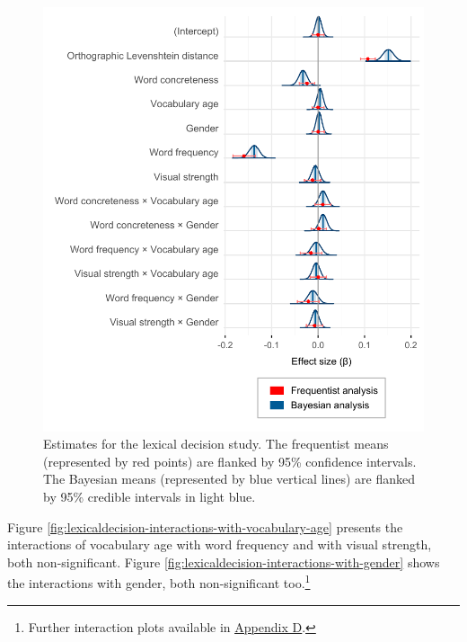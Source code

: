\documentclass[
  12pt,
  man,floatsintext]{apa7}
\begin{document}
\begin{figure}

{\centering \includegraphics[width=1\linewidth]{../lexicaldecision/frequentist_bayesian_plots/plots/lexicaldecision_frequentist_bayesian_plot_weaklyinformativepriors_exgaussian} 

}

\caption{Estimates for the lexical decision study. The frequentist means (represented by red points) are flanked by 95\% confidence intervals. The Bayesian means (represented by blue vertical lines) are flanked by 95\% credible intervals in light blue.}\label{fig:lexicaldecision-frequentist-bayesian-plot-weaklyinformativepriors-exgaussian}
\end{figure}

Figure \ref{fig:lexicaldecision-interactions-with-vocabulary-age} presents the interactions of vocabulary age with word frequency and with visual strength, both non-significant. Figure \ref{fig:lexicaldecision-interactions-with-gender} shows the interactions with gender, both non-significant too.\footnote{Further interaction plots available in \protect\hyperlink{appendix-D-interaction-plots}{\underline{Appendix D}}.}
\end{document}
